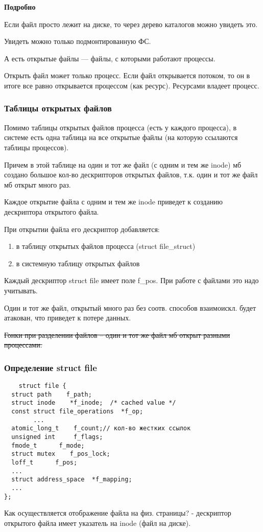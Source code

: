 \textbf{Подробно}

Если файл просто лежит на диске, то через дерево каталогов можно увидеть это. 

Увидеть можно только подмонтированную ФС.

А есть открытые файлы --- файлы, с которыми работают процессы.

Открыть файл может только процесс. Если файл открывается потоком, то он в итоге все равно открывается процессом (как ресурс). Ресурсами владеет процесс.


\subsubsection{Таблицы открытых файлов}

Помимо таблицы открытых файлов процесса (есть у каждого процесса), в системе есть одна таблица на все открытые файлы (на которую ссылаются таблицы процессов).

Причем в этой таблице на один и тот же файл (с одним и тем же inode) мб создано большое кол-во дескрипторов открытых файлов, т.к. один и тот же файл мб открыт много раз. 

Каждое открытие файла с одним и тем же inode приведет к созданию дескриптора открытого файла.

При открытии файла его дескриптор добавляется:
\begin{enumerate}
    \item в таблицу открытых файлов процесса (struct file\_struct)
    \item в системную таблицу открытых файлов
\end{enumerate}

Каждый дескриптор struct file имеет поле f\_pos. При работе с файлами это надо учитывать.

Один и тот же файл, открытый много раз без соотв. способов взаимоискл. будет атакован, что приведет к потере данных.

\sout{Гонки при разделении файлов -- один и тот же файл мб открыт разными процессами.}

\subsubsection{Определение struct file}
\begin{lstlisting}
    struct file {
  struct path    f_path;
  struct inode    *f_inode;  /* cached value */
  const struct file_operations  *f_op;
        ...
  atomic_long_t    f_count;// кол-во жестких ссылок
  unsigned int     f_flags;
  fmode_t      f_mode;
  struct mutex    f_pos_lock;
  loff_t      f_pos;
  ...
  struct address_space  *f_mapping;
  ...
};
\end{lstlisting}
Как осуществляется отображение файла на физ. страницы? - дескриптор открытого файла имеет указатель на inode (файл на диске).

